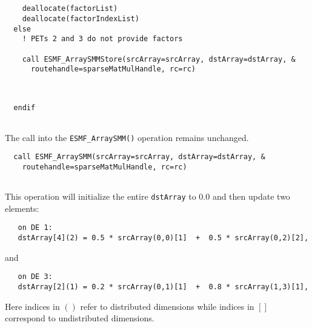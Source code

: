 
 \begin{verbatim}

      
    deallocate(factorList)
    deallocate(factorIndexList)
  else
    ! PETs 2 and 3 do not provide factors
    
    call ESMF_ArraySMMStore(srcArray=srcArray, dstArray=dstArray, &
      routehandle=sparseMatMulHandle, rc=rc)  
 
\end{verbatim}
 

 \begin{verbatim}

  endif
 
\end{verbatim}
 

   The call into the {\tt ESMF\_ArraySMM()} operation remains
   unchanged. 

 \begin{verbatim}
  call ESMF_ArraySMM(srcArray=srcArray, dstArray=dstArray, &
    routehandle=sparseMatMulHandle, rc=rc)
 
\end{verbatim}
 

   This operation will initialize the entire {\tt dstArray} to 0.0 and then 
   update two elements:
  
   \begin{verbatim}
   on DE 1:
   dstArray[4](2) = 0.5 * srcArray(0,0)[1]  +  0.5 * srcArray(0,2)[2],
   \end{verbatim}
  
   and
  
   \begin{verbatim}
   on DE 3:
   dstArray[2](1) = 0.2 * srcArray(0,1)[1]  +  0.8 * srcArray(1,3)[1],
   \end{verbatim}
  
   Here indices in $()$ refer to distributed dimensions while indices in $[]$
   correspond to undistributed dimensions.
\setlength{\parskip}{\oldparskip}
\setlength{\parindent}{\oldparindent}
\setlength{\baselineskip}{\oldbaselineskip}
